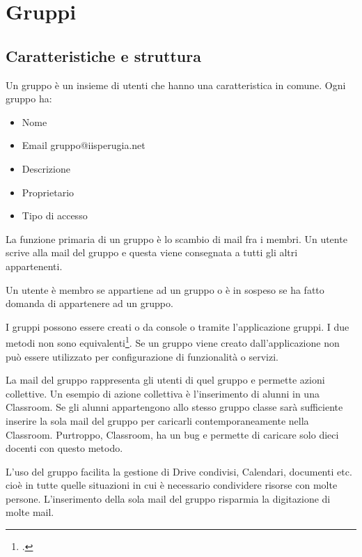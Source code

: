 \chapter{Gruppi}
\section{Caratteristiche e struttura}
Un gruppo è un insieme di utenti che hanno una caratteristica in comune.
Ogni gruppo ha:
\begin{itemize}
	\item Nome	
	\item Email gruppo@iisperugia.net
	\item Descrizione
	\item Proprietario 
	\item Tipo di accesso
\end{itemize}
La funzione primaria di un gruppo è lo scambio di mail fra i membri. Un utente scrive alla mail del gruppo e questa viene consegnata a tutti gli altri appartenenti. 

Un utente  è membro se appartiene ad un gruppo o è in sospeso se ha fatto domanda di appartenere ad un gruppo.

I gruppi possono essere creati o da console o tramite l'applicazione gruppi.
I due metodi non sono equivalenti\footcite{Google2023f}. Se un gruppo viene creato dall'applicazione non può essere utilizzato per configurazione di funzionalità o servizi.
 
La mail del gruppo rappresenta gli utenti di quel gruppo e permette azioni collettive. Un esempio di azione collettiva è l'inserimento di alunni in una Classroom. Se gli alunni appartengono allo stesso gruppo classe sarà sufficiente inserire la sola mail del gruppo per caricarli contemporaneamente nella Classroom. Purtroppo,  Classroom, ha un bug e permette di caricare solo dieci docenti con questo metodo. 

L'uso del gruppo facilita la gestione di Drive condivisi, Calendari, documenti etc. cioè in tutte quelle situazioni in cui è necessario condividere risorse con molte persone. L'inserimento della sola mail del gruppo risparmia la digitazione di molte mail.

